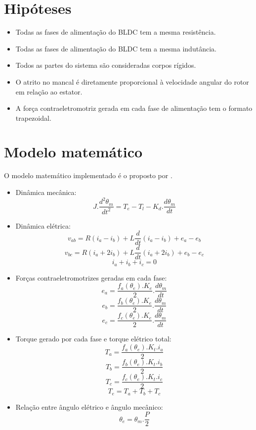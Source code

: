     \section{Hipóteses}
        \begin{itemize}
            \item Todas as fases de alimentação do BLDC tem a mesma resistência.
            \item Todas as fases de alimentação do BLDC tem a mesma indutância.
            \item Todos as partes do sistema são consideradas corpos rígidos.
            \item O atrito no mancal é diretamente proporcional à velocidade angular do rotor em relação ao estator.
            \item A força contraeletromotriz gerada em cada fase de alimentação tem o formato trapezoidal.
        \end{itemize}

    \section{Modelo matemático}
    O modelo matemático implementado é o proposto por \cite{baldursson}.
    \label{sec:modelo_matematico}
        \begin{itemize}
            \item Dinâmica mecânica: $$J.\frac{d^2\theta_m}{dt^2}=T_e-T_l-K_d.\frac{d\theta_m}{dt}$$
            \item Dinâmica elétrica:                
                $$v_{ab} = R(i_a-i_b)+L\frac{d}{dt}(i_a-i_b)+e_a-e_b$$
                $$v_{bc} = R(i_a+2i_b)+L\frac{d}{dt}(i_a+2i_b)+e_b-e_c$$ 
                $$i_a+i_b+i_c=0$$
            \item Forças contraeletromotrizes geradas em cada fase:
                $$e_a = \frac{f_a(\theta_e).K_e}{2}.\frac{d\theta_m}{dt} $$
                $$e_b = \frac{f_b(\theta_e).K_e}{2}.\frac{d\theta_m}{dt} $$
                $$e_c = \frac{f_c(\theta_e).K_e}{2}.\frac{d\theta_m}{dt} $$
            \item Torque gerado por cada fase e torque elétrico total:
                $$T_a=\frac{f_a(\theta_e).K_t.i_a}{2}$$
                $$T_b=\frac{f_b(\theta_e).K_t.i_b}{2}$$
                $$T_c=\frac{f_c(\theta_e).K_t.i_c}{2}$$
                $$T_e=T_a+T_b+T_c$$
            \item Relação entre ângulo elétrico e ângulo mecânico:
                $$\theta_e=\theta_m.\frac{P}{2}$$
        \end{itemize}

